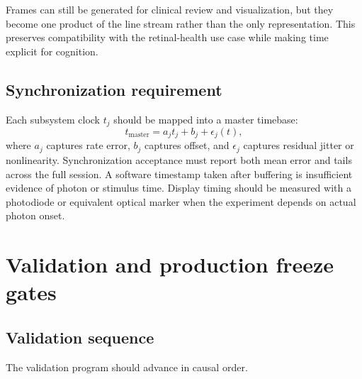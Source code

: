 \documentclass[11pt]{article}
\begin{document}
Frames can still be generated for clinical review and visualization, but they become one product
of the line stream rather than the only representation. This preserves compatibility with the
retinal-health use case while making time explicit for cognition.

\subsection{Synchronization requirement}

Each subsystem clock $t_j$ should be mapped into a master timebase:
\[
  t_{\mathrm{master}} = a_j t_j + b_j + \epsilon_j(t),
\]
where $a_j$ captures rate error, $b_j$ captures offset, and $\epsilon_j$ captures residual jitter or
nonlinearity. Synchronization acceptance must report both mean error and tails across the full
session. A software timestamp taken after buffering is insufficient evidence of photon or stimulus
time. Display timing should be measured with a photodiode or equivalent optical marker when the
experiment depends on actual photon onset.

\section{Validation and production freeze gates}

\subsection{Validation sequence}

The validation program should advance in causal order.
\end{document}
